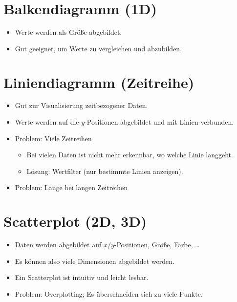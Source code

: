 \documentclass[a4paper, 11pt, accentcolor = tud3b]{tudreport}
\begin{document}
		\section{Balkendiagramm (1D)}
			\begin{itemize}
				\item Werte werden als Größe abgebildet.
				\item Gut geeignet, um Werte zu vergleichen und abzubilden.
			\end{itemize}

		\section{Liniendiagramm (Zeitreihe)}
			\begin{itemize}
				\item Gut zur Visualisierung zeitbezogener Daten.
				\item Werte werden auf die \(y\)-Positionen abgebildet und mit Linien verbunden.
				\item Problem: Viele Zeitreihen
					\begin{itemize}
						\item Bei vielen Daten ist nicht mehr erkennbar, wo welche Linie langgeht.
						\item Lösung: Wertfilter (nur bestimmte Linien anzeigen).
					\end{itemize}
				\item Problem: Länge bei langen Zeitreihen
			\end{itemize}

		\section{Scatterplot (2D, 3D)}
			\begin{itemize}
				\item Daten werden abgebildet auf \(x/y\)-Positionen, Größe, Farbe, \dots
				\item Es können also viele Dimensionen abgebildet werden.
				\item Ein Scatterplot ist intuitiv und leicht lesbar.
				\item Problem: Overplotting; Es überschneiden sich zu viele Punkte.
			\end{itemize}
\end{document}
